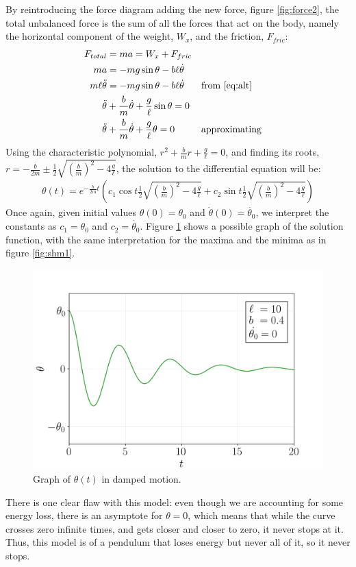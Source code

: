 \documentclass[12pt, a4paper, titlepage]{article}
\theoremstyle{definition}
\numberwithin{equation}{section}
\theoremstyle{definition}
\theoremstyle{definition}
\begin{document}
By reintroducing the force diagram adding the new force, figure \ref{fig:force2}, the total unbalanced force is the sum of all the forces that act on the body, namely the horizontal component of the weight, $W_x$, and the friction, $F_{fric}$:
\begin{align}
F_{total}&=ma=W_x+F_{fric}\\
ma&=-mg\sin\theta-b\ell\dot{\theta}\\
m\ell\ddot{\theta}&=-mg\sin\theta-b\ell\dot{\theta}&&\text{from \eqref{eq:alt}}\\
\ddot{\theta}&+\frac{b}{m}\dot{\theta}+\frac{g}{\ell}\sin\theta=0\\
\ddot{\theta}&+\frac{b}{m}\dot{\theta}+\frac{g}{\ell}\theta=0&&\text{approximating}
\end{align}
Using the characteristic polynomial, $r^2+\frac{b}{m}r+\frac{g}{\ell}=0$, and finding its roots, $r=-\frac{b}{2m}\pm\frac{1}{2}{\sqrt{\left(\frac{b}{m}\right)^2-4\frac{g}{\ell}}}$, the solution to the differential equation will be:
\begin{align}
\theta\left(t\right)=e^{-\frac{b}{2m}t}\left(c_1\cos{t\frac{1}{2}{\sqrt{\left(\frac{b}{m}\right)^2-4\frac{g}{\ell}}}}+c_2\sin{t\frac{1}{2}{\sqrt{\left(\frac{b}{m}\right)^2-4\frac{g}{\ell}}}}\right)
\end{align}
Once again, given initial values $\theta(0)=\theta_0$ and $\dot{\theta}(0)=\dot{\theta_0}$, we interpret the constants as $c_1=\theta_0$ and $c_2=\dot{\theta_0}$. Figure \ref{fig:damped1} shows a possible graph of the solution function, with the same interpretation for the maxima and the minima as in figure \ref{fig:shm1}.
\begin{figure}[H]
    \centering
    \includegraphics[scale=0.7]{damped1.png}
    \caption{Graph of $\theta(t)$ in damped motion.}
    \label{fig:damped1}
\end{figure}
There is one clear flaw with this model: even though we are accounting for some energy loss, there is an asymptote for $\theta=0$, which means that while the curve crosses zero infinite times, and gets closer and closer to zero, it never stops at it. Thus, this model is of a pendulum that loses energy but never all of it, so it never stops.
\end{document}
